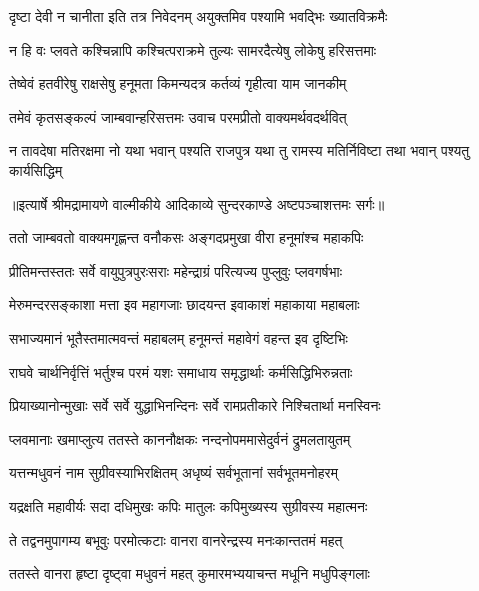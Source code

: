 \twolineshloka
{दृष्टा देवी न चानीता इति तत्र निवेदनम्}
{अयुक्तमिव पश्यामि भवद्भिः ख्यातविक्रमैः} %

\twolineshloka
{न हि वः प्लवते कश्चिन्नापि कश्चित्पराक्रमे}
{तुल्यः सामरदैत्येषु लोकेषु हरिसत्तमाः} %

\twolineshloka
{तेष्वेवं हतवीरेषु राक्षसेषु हनूमता}
{किमन्यदत्र कर्तव्यं गृहीत्वा याम जानकीम्} %

\twolineshloka
{तमेवं कृतसङ्कल्पं जाम्बवान्हरिसत्तमः}
{उवाच परमप्रीतो वाक्यमर्थवदर्थवित्} %

\fourlineindentedshloka
{न तावदेषा मतिरक्षमा नो}
{यथा भवान् पश्यति राजपुत्र}
{यथा तु रामस्य मतिर्निविष्टा}
{तथा भवान् पश्यतु कार्यसिद्धिम्} %


{॥इत्यार्षे श्रीमद्रामायणे वाल्मीकीये आदिकाव्ये सुन्दरकाण्डे अष्टपञ्चाशत्तमः सर्गः॥}


\twolineshloka
{ततो जाम्बवतो वाक्यमगृह्णन्त वनौकसः}
{अङ्गदप्रमुखा वीरा हनूमांश्च महाकपिः} %

\twolineshloka
{प्रीतिमन्तस्ततः सर्वे वायुपुत्रपुरःसराः}
{महेन्द्राग्रं परित्यज्य पुप्लुवुः प्लवगर्षभाः} %

\twolineshloka
{मेरुमन्दरसङ्काशा मत्ता इव महागजाः}
{छादयन्त इवाकाशं महाकाया महाबलाः} %

\twolineshloka
{सभाज्यमानं भूतैस्तमात्मवन्तं महाबलम्}
{हनूमन्तं महावेगं वहन्त इव दृष्टिभिः} %

\twolineshloka
{राघवे चार्थनिर्वृत्तिं भर्तुश्च परमं यशः}
{समाधाय समृद्धार्थाः कर्मसिद्धिभिरुन्नताः} %

\twolineshloka
{प्रियाख्यानोन्मुखाः सर्वे सर्वे युद्धाभिनन्दिनः}
{सर्वे रामप्रतीकारे निश्चितार्था मनस्विनः} %

\twolineshloka
{प्लवमानाः खमाप्लुत्य ततस्ते काननौक्षकः}
{नन्दनोपममासेदुर्वनं द्रुमलतायुतम्} %

\twolineshloka
{यत्तन्मधुवनं नाम सुग्रीवस्याभिरक्षितम्}
{अधृष्यं सर्वभूतानां सर्वभूतमनोहरम्} %

\twolineshloka
{यद्रक्षति महावीर्यः सदा दधिमुखः कपिः}
{मातुलः कपिमुख्यस्य सुग्रीवस्य महात्मनः} %

\twolineshloka
{ते तद्वनमुपागम्य बभूवुः परमोत्कटाः}
{वानरा वानरेन्द्रस्य मनःकान्ततमं महत्} %

\twolineshloka
{ततस्ते वानरा हृष्टा दृष्ट्वा मधुवनं महत्}
{कुमारमभ्ययाचन्त मधूनि मधुपिङ्गलाः} %

